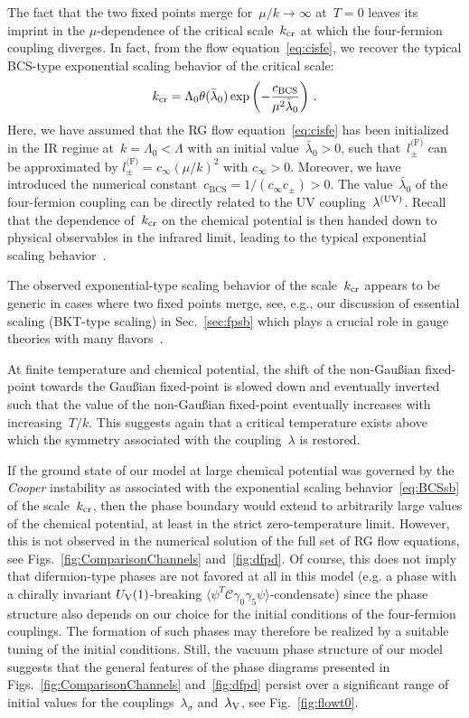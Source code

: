 \documentclass[prd,english,preprintnumbers,amsmath,amssymb,nofootinbib,twocolumn,superscriptaddress]{revtex4-1}
\def\CC{{\mathcal C}}
\newcommand{\be}{\begin{eqnarray}}
\newcommand{\ee}{\end{eqnarray}}
\begin{document}
{{The fact that the two fixed points merge for~$\mu/k\to \infty$ at~$T=0$ leaves its imprint in the $\mu$-dependence
of the critical scale~$k_{\rm cr}$ at which the four-fermion coupling diverges.
In fact, from the flow equation~\eqref{eq:cisfe}, we recover the typical BCS-type exponential scaling behavior of the critical scale:
%
\be
k_{\rm cr} = \Lambda_0\theta(\bar{\lambda}_0)\exp\left(-\frac{c_{\text{BCS}}}{\mu^2\bar{\lambda}_{0}}\right)\,.
\label{eq:BCSsb}
\ee
%
Here, we have assumed that the RG flow equation~\eqref{eq:cisfe} has been initialized in the IR regime at~$k =\Lambda_0<\Lambda$ 
with an initial value~$\bar{\lambda}_0>0$,
such that~$l^{\text{(F)}}_{\pm}$ can be approximated by 
$l^{\text{(F)}}_{\pm} = c_{\infty} (\mu/k)^2$ with $c_{\infty} >0$. 
Moreover, we have introduced the numerical
constant~$c_{\text{BCS}}= 1/(c_{\infty} c_{\pm}) > 0$. 
The value~$\bar{\lambda}_0$ of
the four-fermion coupling can be directly related to the UV coupling~$\lambda^{(\rm UV)}$.
Recall that the dependence 
of~$k_{\rm cr}$ on the chemical potential is then handed down to 
physical observables in the infrared limit, 
leading to the typical exponential scaling behavior~\cite{Bailin:1983bm}.

The observed exponential-type scaling behavior of the scale~$k_{\rm cr}$
appears to be generic in cases where two fixed points merge, see, e.g., our discussion of essential scaling (BKT-type scaling) in
Sec.~\ref{sec:fpsb} which plays a crucial role in gauge theories with many 
flavors~\cite{Miransky:1984ef,Miransky:1988gk,Miransky:1996pd,Braun:2010qs}. 

At finite temperature
and chemical potential, the shift of the
non-Gau\ss ian fixed-point towards the Gau\ss ian fixed-point is slowed down and eventually inverted such that the value of the 
non-Gau\ss ian fixed-point eventually increases with increasing~$T/k$. 
This suggests again that a critical temperature 
exists above which the symmetry associated with 
the coupling~$\lambda$ is restored.

If the ground state of our model at large chemical potential was governed by the {\it Cooper} instability as associated with the 
exponential scaling behavior~\eqref{eq:BCSsb} 
of the scale~$k_{\rm cr}$, then the phase boundary would extend to arbitrarily large values of
the chemical potential, at least in the strict zero-temperature limit. 
However, this is not observed in the numerical solution
of the full set of RG flow equations, see Figs.~\ref{fig:ComparisonChannels} and~\ref{fig:dfpd}. 
Of course, this does not imply
that {difermion-type phases are not favored at all in this model (e.g. a phase with 
a chirally invariant $U_{\rm V}(1)$-breaking $\langle\psi^T \CC \gamma_0 \gamma_5 \psi\rangle$-condensate)} since the phase structure also depends on our choice for the
initial conditions of the four-fermion couplings. The formation of such phases may therefore be realized by a suitable tuning
of the initial conditions. Still, the vacuum phase structure of our model suggests that the general features of the
phase diagrams presented in Figs.~\ref{fig:ComparisonChannels} and~\ref{fig:dfpd} persist over a significant range of initial
values for the couplings~$\lambda_{\sigma}$ and~$\lambda_{\rm V}$, see Fig.~\ref{fig:flowt0}.

}}
\end{document}
